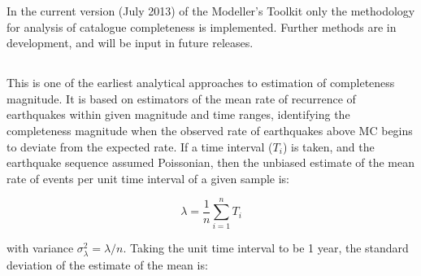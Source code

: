 In the current version (July 2013) of the Modeller's Toolkit only the \cite{Stepp1971} methodology for analysis of catalogue completeness is implemented. Further methods are in development, and will be input in future releases.

%
%

\subsection{\cite{Stepp1971}}

This is one of the earliest analytical approaches to estimation of completeness magnitude. It is based on estimators of the mean rate of recurrence of earthquakes within given magnitude and time ranges, identifying the completeness magnitude when the observed rate of earthquakes above MC begins to deviate from the expected rate. If a time interval ($T_i$) is taken, and the earthquake sequence assumed Poissonian, then the unbiased estimate of the mean rate of events per unit time interval of a given sample is:

\begin{equation}
   \lambda = \frac{1}{n} \sum_{i = 1}^{n} T_i
\end{equation}

with variance $\sigma_{\lambda}^{2} = \lambda / n$. Taking the unit time interval to be 1 year, the standard deviation of the estimate of the mean is:

